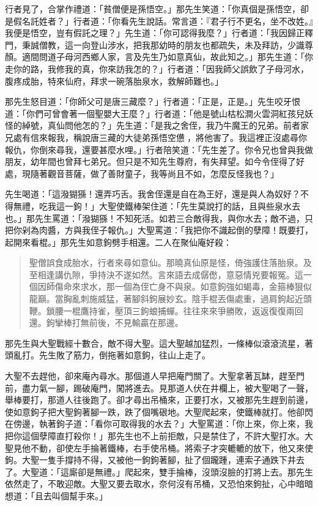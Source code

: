 行者見了，合掌作禮道：「貧僧便是孫悟空。」那先生笑道：「你真個是孫悟空，卻是假名託姓者？」行者道：「你看先生說話。常言道：『君子行不更名，坐不改姓。』我便是悟空，豈有假託之理？」先生道：「你可認得我麼？」行者道：「我因歸正釋門，秉誠僧教，這一向登山涉水，把我那幼時的朋友也都疏失，未及拜訪，少識尊顏。適間問道子母河西鄉人家，言及先生乃如意真仙，故此知之。」那先生道：「你走你的路，我修我的真，你來訪我怎的？」行者道：「因我師父誤飲了子母河水，腹疼成胎，特來仙府，拜求一碗落胎泉水，救解師難也。」

那先生怒目道：「你師父可是唐三藏麼？」行者道：「正是，正是。」先生咬牙恨道：「你們可曾會著一個聖嬰大王麼？」行者道：「他是號山枯松澗火雲洞紅孩兒妖怪的綽號，真仙問他怎的？」先生道：「是我之舍侄，我乃牛魔王的兄弟。前者家兄處有信來報我，稱說唐三藏的大徒弟孫悟空憊𪬯，將他害了。我這裡正沒處尋你報仇，你倒來尋我，還要甚麼水哩。」行者陪笑道：「先生差了。你令兄也曾與我做朋友，幼年間也曾拜七弟兄。但只是不知先生尊府，有失拜望。如今令侄得了好處，現隨著觀音菩薩，做了善財童子，我等尚且不如，怎麼反怪我也？」

先生喝道：「這潑猢猻！還弄巧舌。我舍侄還是自在為王好，還是與人為奴好？不得無禮，吃我這一鉤！」大聖使鐵棒架住道：「先生莫說打的話，且與些泉水去也。」那先生罵道：「潑猢猻！不知死活。如若三合敵得我，與你水去；敵不過，只把你剁為肉醬，方與我侄子報仇。」大聖罵道：「我把你不識起倒的孽障！既要打，起開來看棍。」那先生如意鉤劈手相還。二人在聚仙庵好殺：
\begin{quote}
聖僧誤食成胎水，行者來尋如意仙。那曉真仙原是怪，倚強護住落胎泉。及至相逢講仇隙，爭持決不遂如然。言來語去成僝僽，意惡情兇要報冤。這一個因師傷命來求水，那一個為侄亡身不與泉。如意鉤強如蝎毒，金箍棒狠似龍巔。當胸亂刺施威猛，著腳斜鉤展妙玄。陰手棍丟傷處重，過肩鉤起近頭鞭。鎖腰一棍鷹持雀，壓頂三鉤蜋捕蟬。往往來來爭勝敗，返返復復兩回還。鉤攣棒打無前後，不見輸贏在那邊。
\end{quote}

那先生與大聖戰經十數合，敵不得大聖。這大聖越加猛烈，一條棒似滾滾流星，著頭亂打。先生敗了筋力，倒拖著如意鉤，往山上走了。

大聖不去趕他，卻來庵內尋水。那個道人早把庵門關了。大聖拿著瓦缽，趕至門前，盡力氣一腳，踢破庵門，闖將進去。見那道人伏在井欄上，被大聖喝了一聲，舉棒要打，那道人往後跑了。卻才尋出吊桶來，正要打水，又被那先生趕到前邊，使如意鉤子把大聖鉤著腳一跌，跌了個嘴硍地。大聖爬起來，使鐵棒就打。他卻閃在傍邊，執著鉤子道：「看你可取得我的水去？」大聖罵道：「你上來，你上來，我把你這個孽障直打殺你！」那先生也不上前拒敵，只是禁住了，不許大聖打水。大聖見他不動，卻使左手掄著鐵棒，右手使吊桶。將索子才突轆轆的放下，他又來使鉤。大聖一隻手撐持不得，又被他一鉤鉤著腳，扯了個躘踵，連索子通跌下井去了。大聖道：「這廝卻是無禮。」爬起來，雙手掄棒，沒頭沒臉的打將上去。那先生依然走了，不敢迎敵。大聖又要去取水，奈何沒有吊桶，又恐怕來鉤扯，心中暗暗想道：「且去叫個幫手來。」

